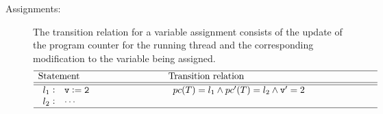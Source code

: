 \begin{description}
\item [Assignments:]
		The transition relation for a variable assignment consists of the 
		update of the program counter for the running thread and the 
		corresponding modification to the variable being assigned.
%
			\[
			\begin{array}[t]{p{8em}@{\hspace{6em}}p{\longtablesize}}
				\hline
				Statement & Transition relation \\ \hline\hline
				$\begin{array}[t]{l@{\hspace{0.3em}}c@{\hspace{1em}}l}
					l_1 & : & \mathtt{v := 2} \\
					l_2 & : & \mathtt{\cdots}
				\end{array}$
				&
				$\begin{array}[t]{ll}
					 \pc(T) = l_1 \andcond
					 \pc'(T) = l_2 \andcond
					 \mathtt{v}' = 2
				 \end{array}$ \\ 
				 \hline
			\end{array}
			\]


\end{description}
